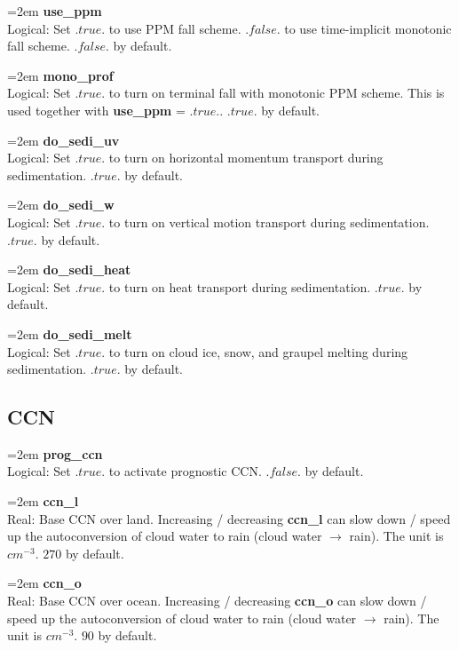 \documentclass[letterpaper,titlepage,10pt]{article}
\numberwithin{equation}{section}
\begin{document}
\begin{appendices}
\hangindent=2em
\textbf{use\_ppm}\\ Logical: Set $.true.$ to use PPM fall scheme. $.false.$ to use time-implicit monotonic fall scheme. $.false.$ by default.

\hangindent=2em
\textbf{mono\_prof}\\ Logical: Set $.true.$ to turn on terminal fall with monotonic PPM scheme. This is used together with \textbf{use\_ppm} = $.true.$. $.true.$ by default.

\hangindent=2em
\textbf{do\_sedi\_uv}\\ Logical: Set $.true.$ to turn on horizontal momentum transport during sedimentation. $.true.$ by default.

\hangindent=2em
\textbf{do\_sedi\_w}\\ Logical: Set $.true.$ to turn on vertical motion transport during sedimentation. $.true.$ by default.

\hangindent=2em
\textbf{do\_sedi\_heat}\\ Logical: Set $.true.$ to turn on heat transport during sedimentation. $.true.$ by default.

\hangindent=2em
\textbf{do\_sedi\_melt}\\ Logical: Set $.true.$ to turn on cloud ice, snow, and graupel melting during sedimentation. $.true.$ by default.


\subsection{CCN}

\hangindent=2em
\textbf{prog\_ccn}\\ Logical: Set $.true.$ to activate prognostic CCN. $.false.$ by default.

\hangindent=2em
\textbf{ccn\_l}\\ Real: Base CCN over land. Increasing / decreasing \textbf{ccn\_l} can slow down / speed up the autoconversion of cloud water to rain (cloud water $\rightarrow$ rain). The unit is $cm^{-3}$. $270$ by default.

\hangindent=2em
\textbf{ccn\_o}\\ Real: Base CCN over ocean. Increasing / decreasing \textbf{ccn\_o} can slow down / speed up the autoconversion of cloud water to rain (cloud water $\rightarrow$ rain). The unit is $cm^{-3}$. $90$ by default.


\end{appendices}
\end{document}
